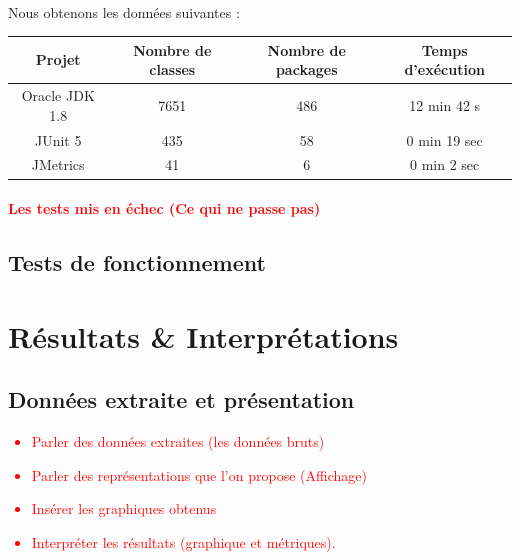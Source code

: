 \documentclass{scrartcl}
\begin{document}
    \paragraph{}Nous obtenons les données suivantes : 
    \begin{center}
        \begin{tabular}{|c|c|c|c|}\hline
            Projet & Nombre de classes & Nombre de packages & Temps d'exécution \\ \hline
            Oracle JDK 1.8 & 7651 & 486 & 12 min 42 s \\ \hline
            JUnit 5 & 435 & 58 & 0 min 19 sec \\ \hline
            JMetrics & 41 & 6 & 0 min 2 sec \\ \hline
        \end{tabular}
    \end{center}

    \paragraph{\textcolor{red}{Les tests mis en échec (Ce qui ne passe pas)}}


\subsection{Tests de fonctionnement}

\newpage
\section{Résultats \& Interprétations}

    \subsection{Données extraite et présentation}
    \textcolor{red}{
    \begin{itemize}
        \item Parler des données extraites (les données bruts)
        \item Parler des représentations que l'on propose (Affichage)
        \item Insérer les graphiques obtenus
        \item Interpréter les résultats (graphique et métriques).
    \end{itemize}
    }
    
\end{document}
